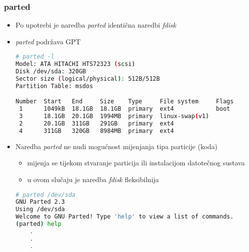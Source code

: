 \documentclass[croatian,t]{beamer} %
\begin{document}
	\begin{frame}[fragile]
	\frametitle{parted}
		\begin{itemize}
			\item Po upotrebi je naredba \textit{parted} identična naredbi \textit{fdisk}
			\item \textit{parted} podržava GPT  
		\begin{lstlisting}[basicstyle={\tiny\ttfamily},language=bash]
# parted -l
Model: ATA HITACHI HTS72323 (scsi)
Disk /dev/sda: 320GB
Sector size (logical/physical): 512B/512B
Partition Table: msdos

Number  Start   End     Size    Type     File system     Flags
 1      1049kB  18.1GB  18.1GB  primary  ext4            boot
 3      18.1GB  20.1GB  1994MB  primary  linux-swap(v1)
 2      20.1GB  311GB   291GB   primary  ext4
 4      311GB   320GB   8984MB  primary  ext4
		\end{lstlisting}
			\item Naredba \textit{parted} ne nudi mogućnost mijenjanja tipa particije (koda)
			\begin{itemize}
				\item mijenja se tijekom stvaranje particija ili instalacijom datotečnog sustava
				\item u ovom slučaju je naredba \textit{fdisk} fleksibilnija
			\end{itemize}
		\begin{lstlisting}[basicstyle={\tiny\ttfamily},language=bash]
# parted /dev/sda
GNU Parted 2.3
Using /dev/sda
Welcome to GNU Parted! Type 'help' to view a list of commands.
(parted) help
    .
    .
    .
		\end{lstlisting}
		\end{itemize}
	\end{frame}	
	
\end{document}

